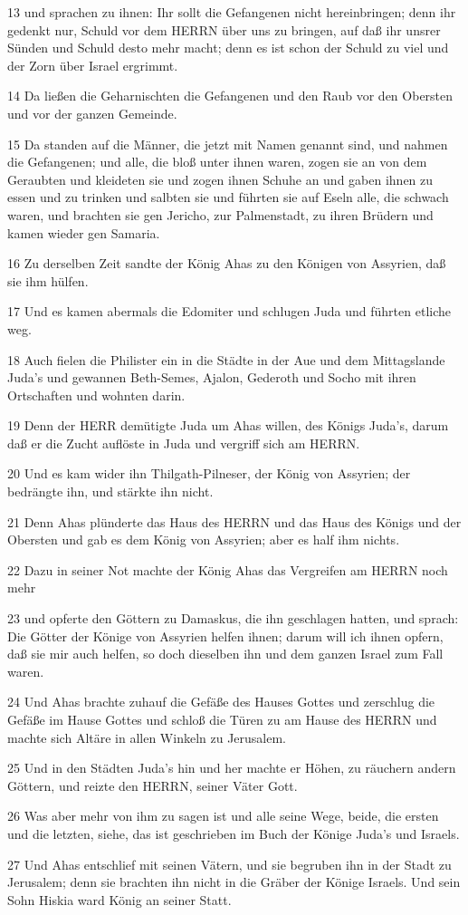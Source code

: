 \par 13 und sprachen zu ihnen: Ihr sollt die Gefangenen nicht hereinbringen; denn ihr gedenkt nur, Schuld vor dem HERRN über uns zu bringen, auf daß ihr unsrer Sünden und Schuld desto mehr macht; denn es ist schon der Schuld zu viel und der Zorn über Israel ergrimmt.
\par 14 Da ließen die Geharnischten die Gefangenen und den Raub vor den Obersten und vor der ganzen Gemeinde.
\par 15 Da standen auf die Männer, die jetzt mit Namen genannt sind, und nahmen die Gefangenen; und alle, die bloß unter ihnen waren, zogen sie an von dem Geraubten und kleideten sie und zogen ihnen Schuhe an und gaben ihnen zu essen und zu trinken und salbten sie und führten sie auf Eseln alle, die schwach waren, und brachten sie gen Jericho, zur Palmenstadt, zu ihren Brüdern und kamen wieder gen Samaria.
\par 16 Zu derselben Zeit sandte der König Ahas zu den Königen von Assyrien, daß sie ihm hülfen.
\par 17 Und es kamen abermals die Edomiter und schlugen Juda und führten etliche weg.
\par 18 Auch fielen die Philister ein in die Städte in der Aue und dem Mittagslande Juda's und gewannen Beth-Semes, Ajalon, Gederoth und Socho mit ihren Ortschaften und wohnten darin.
\par 19 Denn der HERR demütigte Juda um Ahas willen, des Königs Juda's, darum daß er die Zucht auflöste in Juda und vergriff sich am HERRN.
\par 20 Und es kam wider ihn Thilgath-Pilneser, der König von Assyrien; der bedrängte ihn, und stärkte ihn nicht.
\par 21 Denn Ahas plünderte das Haus des HERRN und das Haus des Königs und der Obersten und gab es dem König von Assyrien; aber es half ihm nichts.
\par 22 Dazu in seiner Not machte der König Ahas das Vergreifen am HERRN noch mehr
\par 23 und opferte den Göttern zu Damaskus, die ihn geschlagen hatten, und sprach: Die Götter der Könige von Assyrien helfen ihnen; darum will ich ihnen opfern, daß sie mir auch helfen, so doch dieselben ihn und dem ganzen Israel zum Fall waren.
\par 24 Und Ahas brachte zuhauf die Gefäße des Hauses Gottes und zerschlug die Gefäße im Hause Gottes und schloß die Türen zu am Hause des HERRN und machte sich Altäre in allen Winkeln zu Jerusalem.
\par 25 Und in den Städten Juda's hin und her machte er Höhen, zu räuchern andern Göttern, und reizte den HERRN, seiner Väter Gott.
\par 26 Was aber mehr von ihm zu sagen ist und alle seine Wege, beide, die ersten und die letzten, siehe, das ist geschrieben im Buch der Könige Juda's und Israels.
\par 27 Und Ahas entschlief mit seinen Vätern, und sie begruben ihn in der Stadt zu Jerusalem; denn sie brachten ihn nicht in die Gräber der Könige Israels. Und sein Sohn Hiskia ward König an seiner Statt.

